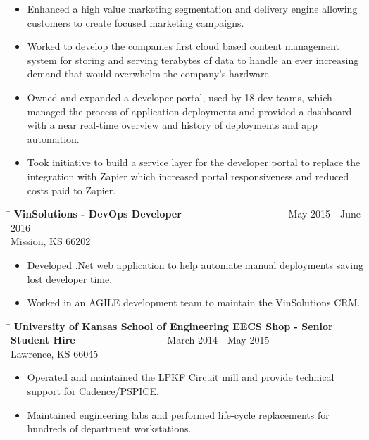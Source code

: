 \documentclass{res}
\begin{document}
\begin{resume}
\begin{changemargin}{-0.25in}{0in}
\begin{itemize}
		\item Enhanced a high value marketing segmentation and delivery engine allowing customers to create focused marketing campaigns.
		\item Worked to develop the companies first cloud based content management system for storing and serving terabytes of data to handle an ever increasing demand that would overwhelm the company's hardware.
		\item Owned and expanded a developer portal, used by 18 dev teams, which managed the process of application deployments and provided a dashboard with a near real-time overview and history of deployments and app automation.
		\item Took initiative to build a service layer for the developer portal to replace the integration with Zapier which increased portal responsiveness and reduced costs paid to Zapier. \vspace{-15pt}
	\end{itemize}
	\vspace{0.2in}
	\begin{tabbing}
	\hspace{5.5in}\= \kill 
	{\bf VinSolutions - DevOps Developer} \>~~~~~~~~~~~~~~~~~~~~~May 2015 - June 2016\\
	Mission, KS 66202
	\end{tabbing}\vspace{-1pt}
	\begin{itemize}
		\item Developed .Net web application to help automate manual deployments saving lost developer time.
		\item Worked in an AGILE development team to maintain the VinSolutions CRM.\vspace{-15pt}
	\end{itemize}
	\vspace{0.2in}
   \begin{tabbing}
   \hspace{5.5in}\= \kill
   {\bf University of Kansas School of Engineering EECS Shop - Senior Student Hire}  \>~~~~~~~~~~~~~~~~~~March 2014 - May 2015\\
   Lawrence, KS 66045
	\end{tabbing}\vspace{-1pt}
	\begin{itemize}
		\item Operated and maintained the LPKF Circuit mill and provide technical support for Cadence/PSPICE.
		\item Maintained engineering labs and performed life-cycle replacements for hundreds of department workstations.

\end{itemize}
\end{changemargin}
\end{resume}
\end{document}
